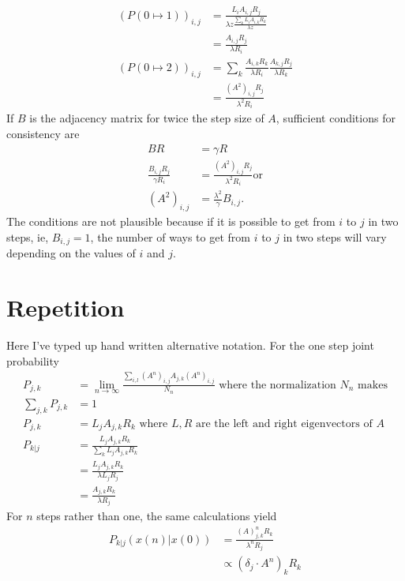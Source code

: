 \documentclass[12pt]{article} \usepackage{amsmath,amsfonts}
\begin{document}
\begin{align*}
  \left( P(0\mapsto 1) \right)_{i,j} &= \frac{L_i A_{i,j} R_j}
    {\lambda z \frac{\sum_k L_i A_{i,k} R_k}{\lambda z}} \\
  &= \frac{A_{i,j} R_j}{\lambda R_i} \\
  \left( P(0\mapsto 2) \right)_{i,j} &=
     \sum_k \frac{A_{i,k} R_k}{\lambda R_i}
            \frac{A_{k,j} R_j}{\lambda R_k} \\
  &= \frac{(A^2)_{i,j} R_j}{\lambda^2 R_i}                                       
\end{align*}
If $B$ is the adjacency matrix for twice the step size of $A$,
sufficient conditions for consistency are
\begin{align*}
  B R &= \gamma R \\
  \frac{B_{i,j} R_j}{\gamma R_i} &= \frac{(A^2)_{i,j} R_j}{\lambda^2
                                   R_i} \text{or}\\
  (A^2)_{i,j} &= \frac{\lambda^2}{\gamma} B_{i,j}.
\end{align*}
The conditions are not plausible because if it is possible to get from
$i$ to $j$ in two steps, ie, $B_{i,j}=1$, the number of ways to get
from $i$ to $j$ in two steps will vary depending on the values of $i$
and $j$.

\section{Repetition}
\label{sec:repetition}

Here I've typed up hand written alternative notation.  For the one
step joint probability
\begin{align*}
  P_{j,k} &= \lim_{n\rightarrow \infty} \frac {\sum_{i,l} \left(A^n
            \right)_{i,j} A_{j,k}  \left(A^n \right)_{i,j} }{N_n}
            \text{ where the normalization } N_n \text{ makes} \\
  \sum_{j,k}P_{j,k} &= 1   \\
  P_{j,k} &= L_j A_{j,k} R_k \text{ where } L,R \text{ are the left and right
    eigenvectors of } A \\
  P_{k|j} &= \frac{L_j A_{j,k} R_k}{\sum_k L_j A_{j,k} R_k} \\
  &= \frac{L_j A_{j,k} R_k}{\lambda L_j R_j} \\
  &= \frac{A_{j,k} R_k}{\lambda R_j}
\end{align*}
For $n$ steps rather than one, the same calculations yield
\begin{align*}
  P_{k|j}(x(n)|x(0)) &= \frac{\left( A \right)^n_{j,k} R_k}{\lambda^n
                       R_j} \\
  &\propto \left( \delta_j \cdot A^n \right)_k R_k
\end{align*}
\end{document}
